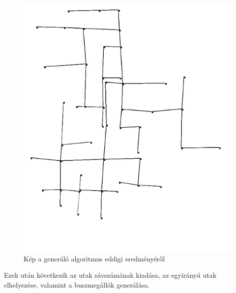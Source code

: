 \begin{figure}[H]
\includegraphics[width=\linewidth]{graph.png}
\caption{Kép a generáló algoritmus eddigi eredményéről}
\label{fig:graph}
\end{figure}
Ezek után következik az utak sávszámának kiadása, az egyirányú utak elhelyezése, valamint a buszmegállók generálása.